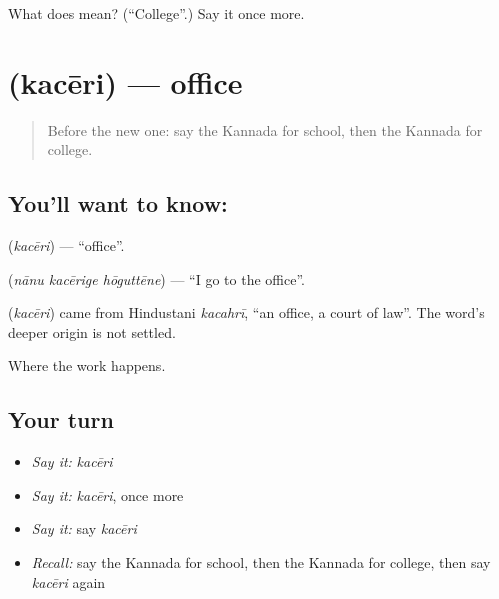 \begin{tcolorbox}[breakable,colback=teal!4,colframe=teal!35!black,title={Before you move on}]
What does  mean? (\textquotedblleft{}College\textquotedblright{}.) Say it once more.
\end{tcolorbox}
\section[\texorpdfstring{\kn{ಕಚೇರಿ} (kacēri)}{ಕಚೇರಿ (kacēri)}]{ (kacēri) — office}

\label{lesson:KA-C92-office}



\begin{quote}
Before the new one: say the Kannada for school, then the Kannada for college.
\end{quote}

\subsection*{You'll want to know: }
\textbf{} (\emph{kacēri}) — \textquotedblleft{}office\textquotedblright{}.

\textbf{  } (\emph{nānu kacērige hōguttēne}) — \textquotedblleft{}I go to the office\textquotedblright{}.

\begin{cousinweb}
\textbf{} (\emph{kacēri}) came from Hindustani \emph{kacahrī}, \textquotedblleft{}an office, a court of law\textquotedblright{}. The word's deeper origin is not settled.
\end{cousinweb}

\begin{grammarlens}[title={What you've built}]
Where the work happens.
\end{grammarlens}

\subsection*{Your turn}
\begin{itemize}
\raggedright
  \item \emph{Say it:} \emph{kacēri}
  \item \emph{Say it:} \emph{kacēri}, once more
  \item \emph{Say it:} say \emph{kacēri}
  \item \emph{Recall:} say the Kannada for school, then the Kannada for college, then say \emph{kacēri} again
\end{itemize}

